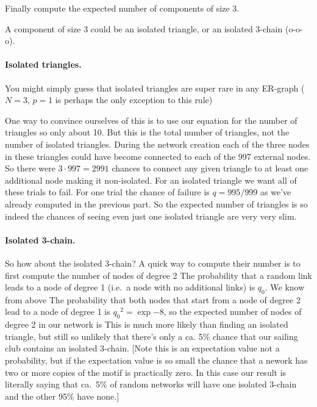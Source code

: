 \subquestion Finally compute the expected number of components of size 3. 

\solution A component of size 3 could be an isolated triangle, or an isolated 3-chain (o-o-o). 

\paragraph{Isolated triangles.}You might simply guess that isolated triangles are super rare in any ER-graph ($N=3$, $p=1$ is perhaps the only exception to this rule) 

One way to convince ourselves of this is to use our equation for the number of triangles 
so only about 10. But this is the total number of triangles, not the number of isolated triangles. During the network creation each of the three nodes in these triangles could have become connected to each of the 997 external nodes. So there were $3\cdot997=2991$ chances to connect any given triangle to at least one additional node making it non-isolated. For an isolated triangle we want all of these trials to fail. For one trial the chance of failure is $q=995/999$ as we've already computed in the previous part. So the expected number of triangles is 
so indeed the chances of seeing even just one isolated triangle are very very slim. 

\paragraph{Isolated 3-chain.}So how about the isolated 3-chain? A quick way to compute their number is to first compute the number of nodes of degree 2
The probability that a random link leads to a node of degree 1 (i.e.~a node with no additional links) is $q_0$. We know from above 
The probability that both nodes that start from a node of degree 2 lead to a node of degree 1 is ${q_0}^2=\exp{-8}$, so the expected number of nodes of degree 2 in our network is 
This is much more likely than finding an isolated triangle, but still so unlikely that there's only a ca. 5\% chance that our sailing club contains an isolated 3-chain. [Note this is an expectation value not a probability, but if the expectation value is so small the chance that a nework has two or more copies of the motif is practically zero. In this case our result is literally saying that ca.~5\% of random networks will have one isolated 3-chain and the other 95\% have none.]
